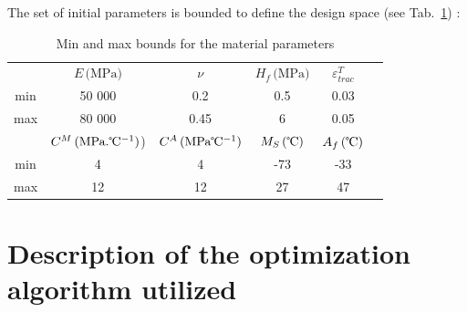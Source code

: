 The set of initial parameters is bounded to define the design space (see Tab.~\ref{tab:parabounds}) : 

\begin{table}[ht]
\caption{Min and max bounds for the material parameters}
\begin{center}
\label{tab:parabounds}
\begin{tabular}{c c c c c c} %
\hline
$ $ &$E\,\mbox{(MPa)}$ & $\nu$ & $H_f\,\mbox{(MPa)}$ & $\varepsilon^{T}_{trac}$ \\
min & 50 000 & 0.2 & 0.5 & 0.03 \\
max & 80 000 & 0.45 & 6 & 0.05 \\
\hline
$ $ & $C^M\,\mbox{(MPa}.\celsius^{-1})$) & $C^A\,\mbox{(MPa}\celsius^{-1})$ & $M_S\,(\celsius)$ & $A_f\,\mbox{(\celsius)}$\\
min & 4 & 4 & -73 & -33 \\
max & 12 & 12 & 27 & 47 \\
\hline
\end{tabular}
\end{center}
\end{table}


\section{Description of the optimization algorithm utilized}
\label{sec:workflow}

